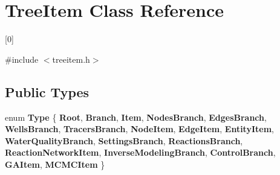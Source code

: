 \hypertarget{class_tree_item}{}\section{Tree\+Item Class Reference}
\label{class_tree_item}


\mbox{[}0\mbox{]}  




{\ttfamily \#include $<$treeitem.\+h$>$}

\subsection*{Public Types}
\begin{DoxyCompactItemize}
\item 
\mbox{\label{class_tree_item_a1dd479e675cc2bc1188a916c9fb55dba}} 
enum {\bfseries Type} \{ \newline
{\bfseries Root}, 
{\bfseries Branch}, 
{\bfseries Item}, 
{\bfseries Nodes\+Branch}, 
\newline
{\bfseries Edges\+Branch}, 
{\bfseries Wells\+Branch}, 
{\bfseries Tracers\+Branch}, 
{\bfseries Node\+Item}, 
\newline
{\bfseries Edge\+Item}, 
{\bfseries Entity\+Item}, 
{\bfseries Water\+Quality\+Branch}, 
{\bfseries Settings\+Branch}, 
\newline
{\bfseries Reactions\+Branch}, 
{\bfseries Reaction\+Network\+Item}, 
{\bfseries Inverse\+Modeling\+Branch}, 
{\bfseries Control\+Branch}, 
\newline
{\bfseries G\+A\+Item}, 
{\bfseries M\+C\+M\+C\+Item}
 \}
\end{DoxyCompactItemize}
